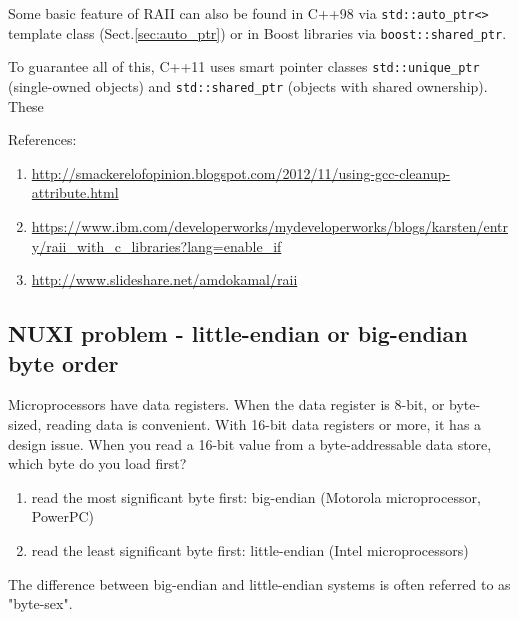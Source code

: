 Some basic feature of RAII can also be found in C++98 via \verb!std::auto_ptr<>!
template class (Sect.\ref{sec:auto_ptr}) or in Boost libraries via \verb!boost::shared_ptr!.

To guarantee all of this, C++11 uses smart
pointer classes \verb!std::unique_ptr! (single-owned objects) and \verb!std::shared_ptr!
(objects with shared ownership). These 




References:
\begin{enumerate}
  \item \url{http://smackerelofopinion.blogspot.com/2012/11/using-gcc-cleanup-attribute.html}
  \item
  \url{https://www.ibm.com/developerworks/mydeveloperworks/blogs/karsten/entry/raii_with_c_libraries?lang=enable_if}
  \item \url{http://www.slideshare.net/amdokamal/raii}
\end{enumerate}

\subsection{NUXI problem - little-endian or big-endian byte order}
\label{sec:byte-order}
\label{sec:little-endian}
\label{sec:big-endian}

Microprocessors have data registers. When the data register is 8-bit, or
byte-sized, reading data is convenient. With 16-bit data registers or more, it
has a design issue. When you read a 16-bit value from a byte-addressable data
store, which byte do you load first?
\begin{enumerate}
  \item read the most significant byte first: big-endian (Motorola
  microprocessor, PowerPC)
  
  \item read the least significant byte first: little-endian (Intel
  microprocessors)
\end{enumerate}
The difference between big-endian and little-endian systems is often referred to
as "byte-sex".  

